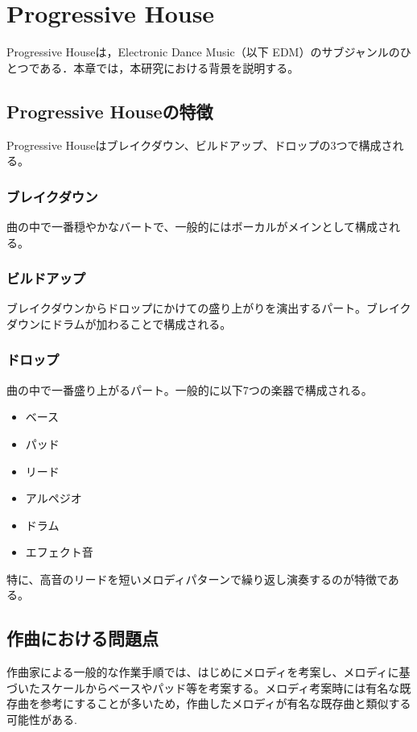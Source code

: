 \chapter{Progressive House}
Progressive Houseは，Electronic Dance Music（以下 EDM）のサブジャンルのひとつである．本章では，本研究における背景を説明する。

\section{Progressive Houseの特徴}
Progressive Houseはブレイクダウン、ビルドアップ、ドロップの3つで構成される。
\subsection{ブレイクダウン}
曲の中で一番穏やかなバートで、一般的にはボーカルがメインとして構成される。

\subsection{ビルドアップ}
ブレイクダウンからドロップにかけての盛り上がりを演出するパート。ブレイクダウンにドラムが加わることで構成される。

\subsection{ドロップ}
曲の中で一番盛り上がるパート。一般的に以下7つの楽器で構成される。

\begin{itemize}
  \item ベース
  \item パッド
  \item リード
  \item アルペジオ
  \item ドラム
  \item エフェクト音
\end{itemize}

特に、高音のリードを短いメロディパターンで繰り返し演奏するのが特徴である。

\section{作曲における問題点}
作曲家による一般的な作業手順では、はじめにメロディを考案し、メロディに基づいたスケールからベースやパッド等を考案する。メロディ考案時には有名な既存曲を参考にすることが多いため，作曲したメロディが有名な既存曲と類似する可能性がある.

